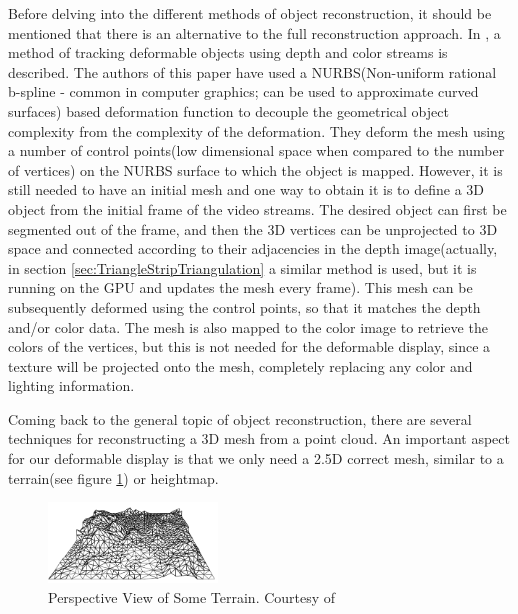 \documentclass[]{article}
\begin{document}
Before delving into the different methods of object reconstruction, it should be mentioned that there is an alternative to the full reconstruction approach. In \cite{Jordt2011}, a method of tracking deformable objects using depth and color streams is described. The authors of this paper have used a NURBS(Non-uniform rational b-spline - common in computer graphics; can be used to approximate curved surfaces) based deformation function to decouple the geometrical object complexity from the complexity of the deformation. They deform the mesh using a number of control points(low dimensional space when compared to the number of vertices) on the NURBS surface to which the object is mapped. However, it is still needed to have an initial mesh and one way to obtain it is to define a 3D object from the initial frame of the video streams. The desired object can first be segmented out of the frame, and then the 3D vertices can be unprojected to 3D space and connected according to their adjacencies in the depth image(actually, in section \ref{sec:TriangleStripTriangulation} a similar method is used, but it is running on the GPU and updates the mesh every frame). This mesh can be subsequently deformed using the control points, so that it matches the depth and/or color data. The mesh is also mapped to the color image to retrieve the colors of the vertices, but this is not needed for the deformable display, since a texture will be projected onto the mesh, completely replacing any color and lighting information.

Coming back to the general topic of object reconstruction, there are several techniques for reconstructing a 3D mesh from a point cloud. An important aspect for our deformable display is that we only need a 2.5D correct mesh, similar to a terrain(see figure \ref{fig:PerspectiveTerrain}) or heightmap. 

\begin{figure}[hbtp]
    \centering
    \includegraphics[width=0.4\textwidth]{figures/PerspectiveTerrain.PNG}
    \caption{Perspective View of Some Terrain. Courtesy of \cite[Chapter~9]{berg08}}
    \label{fig:PerspectiveTerrain}
\end{figure}
\end{document}
